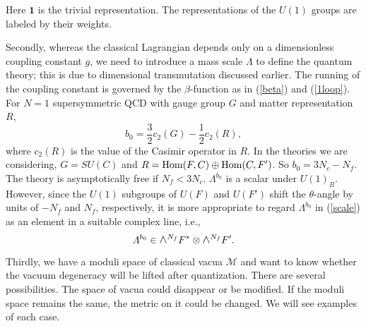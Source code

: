 \documentclass[lecture]{qft-l}
\newcommand{\tht}{\theta}
\newcommand{\Lam}{\varLambda}
\newcommand{\medwedge}{\mbox{\fontsize{12pt}{0pt}\selectfont $\wedge$}}
\newcommand{\inv}[1]{\frac{1}{#1}}
\newcommand{\hf}{{\textstyle \inv{2}}}
\newcommand{\one}{\mathbf{1}}
\newcommand{\MM}{{\mathcal M}}
\newcommand{\Hom}{{\rm Hom}}
\newcommand{\FT}{F'}%
\newcommand{\LINE}{\medwedge^{N_f}F^*\otimes\medwedge^{N_f}\FT}
\numberwithin{figure}{chapter}
\begin{document}
\bigskip\noindent
Here $\one$ is the trivial representation.
The representations of the $U(1)$ groups are labeled by their weights.

Secondly, whereas the classical Lagrangian depends only on a dimensionless 
coupling constant $g$, we need to introduce a mass scale $\Lam$ to define
the quantum theory; this is due to dimensional transmutation discussed earlier.
The running of the coupling constant is governed by the $\beta$-function
as in (\ref{beta}) and (\ref{1loop}).
For $N=1$ supersymmetric QCD with gauge group $G$ and 
matter representation $R$,
\begin{equation}
b_0={\textstyle \frac{3}{2}}c_2(G)-\hf c_2(R),
\end{equation}
where $c_2(R)$ is the value of the Casimir operator in $R$.
In the theories we are considering, $G=SU(C)$ and 
$R=\Hom(F,C)\oplus\Hom(C,\FT)$.
So $b_0=3N_c-N_f$.
The theory is asymptotically free if $N_f<3N_c$.
$\Lam^{b_0}$ is a scalar under $U(1)_B$.
However, since the $U(1)$ subgroups of $U(F)$ and $U(\FT)$ shift the 
$\tht$-angle by units of $-N_f$ and $N_f$, respectively, it is more
appropriate to 
regard $\Lam^{b_0}$ in (\ref{scale}) as an element in 
a suitable complex line, i.e.,
\begin{equation}\label{line}
\Lam^{b_0}\in\LINE.
\end{equation}

Thirdly, we have a moduli space of classical vacua $\MM$ and want to know
whether the vacuum degeneracy will be lifted after quantization.
There are several possibilities.
The space of vacua could disappear or be modified.
If the moduli space remains the same, the metric on it could be changed.
We will see examples of each case.
\end{document}
